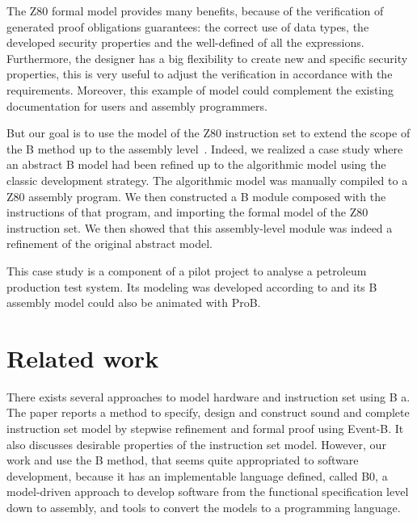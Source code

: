 \documentclass[a4paper]{llncs}
\begin{document}
The Z80 formal model provides many benefits, because of the
verification of generated proof obligations guarantees: the correct
use of data types, the developed security properties and the
well-defined of all the expressions.  Furthermore, the designer has a
big flexibility to create new and specific security properties, this
is very
useful %
to adjust the verification in accordance with the
requirements. Moreover, this example of model could complement the
existing documentation for users and assembly programmers. 

But our goal is to use the model of the Z80 instruction set to extend
the scope of the B method up to the assembly
level~\cite{Dantas_SBMF08}. Indeed, we realized a case study where an
abstract B model had been refined up to the algorithmic model using
the classic development strategy. The algorithmic model was manually
compiled to a Z80 assembly program. We then constructed a B module
composed with the instructions of that program, and importing the
formal model of the Z80 instruction set. We then showed that this
assembly-level module was indeed a refinement of the original abstract
model.

This case study is a component of a pilot project to analyse a
petroleum production test system. Its modeling was developed according
to \cite{LAUT_SERGIO} and its B assembly model could also be animated
with ProB.

\section{Related work}
\label{sec:relatedworks}

There exists several approaches to model hardware and instruction set
using B a.  The paper \cite{springerlink:Yuan2011} reports a method to
specify, design and construct sound and complete instruction set model
by stepwise refinement and formal proof using Event-B. It also
discusses desirable properties of the instruction set model. However,
our work \cite{Valerio_SBMF09} and \cite{Subotic2010} use the B
method, that seems quite appropriated to software development, because
it has an implementable language defined, called B0, a model-driven
approach \cite{Dantas_SBMF08} to develop software from the functional
specification level down to assembly, and tools to convert the models
to a programming language.
\end{document}
